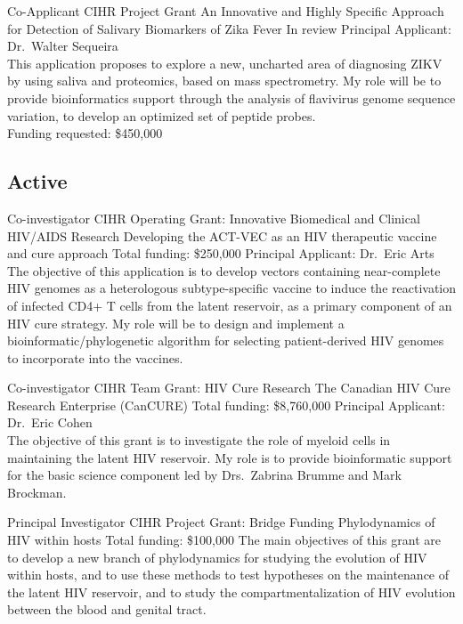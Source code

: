 \documentclass[11pt]{moderncv}
\begin{document}
{Co-Applicant}
{CIHR Project Grant}
{An Innovative and Highly Specific Approach for Detection of Salivary Biomarkers of Zika Fever}
{In review}
{
Principal Applicant: Dr.~Walter Sequeira\\
This application proposes to explore a new, uncharted area of diagnosing ZIKV by using
saliva and proteomics, based on mass spectrometry.
My role will be to provide bioinformatics support through the analysis of flavivirus genome sequence variation, to develop an optimized set of peptide probes.\\
Funding requested: \$450,000
}


\vspace{1em}
\subsection {Active}

{Co-investigator}
{CIHR Operating Grant: Innovative Biomedical and Clinical HIV/AIDS Research}
{Developing the ACT-VEC as an HIV therapeutic vaccine and cure approach}
{Total funding: \$250,000}
{
Principal Applicant: Dr.~Eric Arts\\
The objective of this application is to develop vectors containing near-complete HIV genomes as a heterologous subtype-specific vaccine to induce the reactivation of infected CD4+ T cells from the latent reservoir, as a primary component of an HIV cure strategy.
My role will be to design and implement a bioinformatic/phylogenetic algorithm for selecting patient-derived HIV genomes to incorporate into the vaccines.
}

{Co-investigator}
{CIHR Team Grant: HIV Cure Research}
{The Canadian HIV Cure Research Enterprise (CanCURE)}
{Total funding: \$8,760,000}
{
Principal Applicant: Dr.~Eric Cohen\\
The objective of this grant is to investigate the role of myeloid cells in maintaining the latent HIV reservoir.
My role is to provide bioinformatic support for the basic science component led by Drs.~Zabrina Brumme and Mark Brockman.
}

{Principal Investigator}
{CIHR Project Grant: Bridge Funding}
{Phylodynamics of HIV within hosts}
{Total funding: \$100,000}
{
The main objectives of this grant are to develop a new branch of phylodynamics for studying the evolution of HIV within hosts, and to use these methods to test hypotheses on the maintenance of the latent HIV reservoir, and to study the compartmentalization of HIV evolution between the blood and genital tract.\\
}
\end{document}
